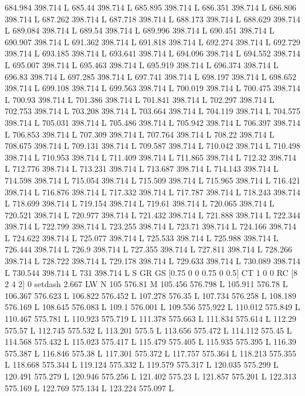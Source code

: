 684.984 398.714 L
685.44 398.714 L
685.895 398.714 L
686.351 398.714 L
686.806 398.714 L
687.262 398.714 L
687.718 398.714 L
688.173 398.714 L
688.629 398.714 L
689.084 398.714 L
689.54 398.714 L
689.996 398.714 L
690.451 398.714 L
690.907 398.714 L
691.362 398.714 L
691.818 398.714 L
692.274 398.714 L
692.729 398.714 L
693.185 398.714 L
693.641 398.714 L
694.096 398.714 L
694.552 398.714 L
695.007 398.714 L
695.463 398.714 L
695.919 398.714 L
696.374 398.714 L
696.83 398.714 L
697.285 398.714 L
697.741 398.714 L
698.197 398.714 L
698.652 398.714 L
699.108 398.714 L
699.563 398.714 L
700.019 398.714 L
700.475 398.714 L
700.93 398.714 L
701.386 398.714 L
701.841 398.714 L
702.297 398.714 L
702.753 398.714 L
703.208 398.714 L
703.664 398.714 L
704.119 398.714 L
704.575 398.714 L
705.031 398.714 L
705.486 398.714 L
705.942 398.714 L
706.397 398.714 L
706.853 398.714 L
707.309 398.714 L
707.764 398.714 L
708.22 398.714 L
708.675 398.714 L
709.131 398.714 L
709.587 398.714 L
710.042 398.714 L
710.498 398.714 L
710.953 398.714 L
711.409 398.714 L
711.865 398.714 L
712.32 398.714 L
712.776 398.714 L
713.231 398.714 L
713.687 398.714 L
714.143 398.714 L
714.598 398.714 L
715.054 398.714 L
715.509 398.714 L
715.965 398.714 L
716.421 398.714 L
716.876 398.714 L
717.332 398.714 L
717.787 398.714 L
718.243 398.714 L
718.699 398.714 L
719.154 398.714 L
719.61 398.714 L
720.065 398.714 L
720.521 398.714 L
720.977 398.714 L
721.432 398.714 L
721.888 398.714 L
722.344 398.714 L
722.799 398.714 L
723.255 398.714 L
723.71 398.714 L
724.166 398.714 L
724.622 398.714 L
725.077 398.714 L
725.533 398.714 L
725.988 398.714 L
726.444 398.714 L
726.9 398.714 L
727.355 398.714 L
727.811 398.714 L
728.266 398.714 L
728.722 398.714 L
729.178 398.714 L
729.633 398.714 L
730.089 398.714 L
730.544 398.714 L
731 398.714 L
S
GR
GS
[0.75 0 0 0.75 0 0.5] CT
1 0 0 RC
[8 2 4 2] 0 setdash
2.667 LW
N
105 576.81 M
105.456 576.798 L
105.911 576.78 L
106.367 576.623 L
106.822 576.452 L
107.278 576.35 L
107.734 576.258 L
108.189 576.169 L
108.645 576.083 L
109.1 576.001 L
109.556 575.922 L
110.012 575.849 L
110.467 575.781 L
110.923 575.719 L
111.378 575.663 L
111.834 575.614 L
112.29 575.57 L
112.745 575.532 L
113.201 575.5 L
113.656 575.472 L
114.112 575.45 L
114.568 575.432 L
115.023 575.417 L
115.479 575.405 L
115.935 575.395 L
116.39 575.387 L
116.846 575.38 L
117.301 575.372 L
117.757 575.364 L
118.213 575.355 L
118.668 575.344 L
119.124 575.332 L
119.579 575.317 L
120.035 575.299 L
120.491 575.279 L
120.946 575.256 L
121.402 575.23 L
121.857 575.201 L
122.313 575.169 L
122.769 575.134 L
123.224 575.097 L
